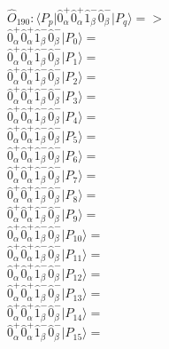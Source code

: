 \documentclass[14pt]{article}
\begin{document}
    $\hat{O}_{190}:  \langle{P_p}\vert \hat{0}_{\alpha}^{+}\hat{0}_{\alpha}^{+}\hat{1}_{\beta}^{-}\hat{0}_{\beta}^{-} \vert{P_q}\rangle => $ \\ 
    $ \hat{0}_{\alpha}^{+}\hat{0}_{\alpha}^{+}\hat{1}_{\beta}^{-}\hat{0}_{\beta}^{-} \vert{P_{0}}\rangle =  $ \\ 
    $ \hat{0}_{\alpha}^{+}\hat{0}_{\alpha}^{+}\hat{1}_{\beta}^{-}\hat{0}_{\beta}^{-} \vert{P_{1}}\rangle =  $ \\ 
    $ \hat{0}_{\alpha}^{+}\hat{0}_{\alpha}^{+}\hat{1}_{\beta}^{-}\hat{0}_{\beta}^{-} \vert{P_{2}}\rangle =  $ \\ 
    $ \hat{0}_{\alpha}^{+}\hat{0}_{\alpha}^{+}\hat{1}_{\beta}^{-}\hat{0}_{\beta}^{-} \vert{P_{3}}\rangle =  $ \\ 
    $ \hat{0}_{\alpha}^{+}\hat{0}_{\alpha}^{+}\hat{1}_{\beta}^{-}\hat{0}_{\beta}^{-} \vert{P_{4}}\rangle =  $ \\ 
    $ \hat{0}_{\alpha}^{+}\hat{0}_{\alpha}^{+}\hat{1}_{\beta}^{-}\hat{0}_{\beta}^{-} \vert{P_{5}}\rangle =  $ \\ 
    $ \hat{0}_{\alpha}^{+}\hat{0}_{\alpha}^{+}\hat{1}_{\beta}^{-}\hat{0}_{\beta}^{-} \vert{P_{6}}\rangle =  $ \\ 
    $ \hat{0}_{\alpha}^{+}\hat{0}_{\alpha}^{+}\hat{1}_{\beta}^{-}\hat{0}_{\beta}^{-} \vert{P_{7}}\rangle =  $ \\ 
    $ \hat{0}_{\alpha}^{+}\hat{0}_{\alpha}^{+}\hat{1}_{\beta}^{-}\hat{0}_{\beta}^{-} \vert{P_{8}}\rangle =  $ \\ 
    $ \hat{0}_{\alpha}^{+}\hat{0}_{\alpha}^{+}\hat{1}_{\beta}^{-}\hat{0}_{\beta}^{-} \vert{P_{9}}\rangle =  $ \\ 
    $ \hat{0}_{\alpha}^{+}\hat{0}_{\alpha}^{+}\hat{1}_{\beta}^{-}\hat{0}_{\beta}^{-} \vert{P_{10}}\rangle =  $ \\ 
    $ \hat{0}_{\alpha}^{+}\hat{0}_{\alpha}^{+}\hat{1}_{\beta}^{-}\hat{0}_{\beta}^{-} \vert{P_{11}}\rangle =  $ \\ 
    $ \hat{0}_{\alpha}^{+}\hat{0}_{\alpha}^{+}\hat{1}_{\beta}^{-}\hat{0}_{\beta}^{-} \vert{P_{12}}\rangle =  $ \\ 
    $ \hat{0}_{\alpha}^{+}\hat{0}_{\alpha}^{+}\hat{1}_{\beta}^{-}\hat{0}_{\beta}^{-} \vert{P_{13}}\rangle =  $ \\ 
    $ \hat{0}_{\alpha}^{+}\hat{0}_{\alpha}^{+}\hat{1}_{\beta}^{-}\hat{0}_{\beta}^{-} \vert{P_{14}}\rangle =  $ \\ 
    $ \hat{0}_{\alpha}^{+}\hat{0}_{\alpha}^{+}\hat{1}_{\beta}^{-}\hat{0}_{\beta}^{-} \vert{P_{15}}\rangle =  $ \\ 
    
\end{document}
